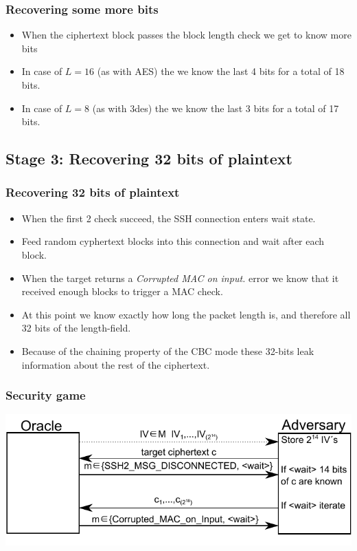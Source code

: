 \documentclass[fleqn]{beamer}
\begin{document}
   \begin{frame}
    \frametitle{Recovering some more bits}
        \begin{itemize}
      \item When the ciphertext block passes the block length check we get to know more bits
      \item In case of $L = 16$ (as with AES) the we know the last 4 bits for a total of 18 bits.
      \item In case of $L = 8$ (as with 3des) the we know the last 3 bits for a total of 17 bits.
    \end{itemize}   
  \end{frame}

 \subsection{Stage 3: Recovering 32 bits of plaintext}
  
   \begin{frame}
    \frametitle{Recovering 32 bits of plaintext}
        \begin{itemize}
      \item When the first 2 check succeed, the SSH connection enters wait state.
      \item Feed random cyphertext blocks into this connection and wait after each block.
      \item When the target returns a \textit{Corrupted MAC on input.} error we know that it received enough blocks to trigger a MAC check.
      \item At this point we know exactly how long the packet length is, and therefore all 32 bits of the length-field. 
      \item Because of the chaining property of the CBC mode these 32-bits leak information about the rest of the ciphertext.
    \end{itemize}   
  \end{frame}	  

  \begin{frame}
    \frametitle{Security game}
    \begin{center}
    \includegraphics[scale=.8]{drawing.pdf}
    \end{center}
  \end{frame}
\end{document}
